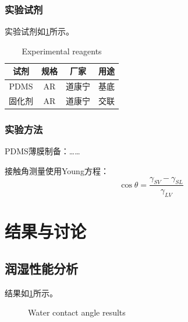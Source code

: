 \documentclass[12pt,a4paper]{swuthesis}
\begin{document}
\subsubsection{实验试剂}

实验试剂如\ref{tab:reagents}所示。

\begin{table}[H]\centering
    \caption{ 实验试剂}
    \addtocounter{table}{-1}
    \renewcommand{\tablename}{Table}
    \caption{ Experimental reagents}
    \renewcommand{\tablename}{表}
    \label{tab:reagents}
    \begin{tabular}{cccc}\toprule
        试剂 & 规格 & 厂家 & 用途 \\\midrule
        PDMS & AR & 道康宁 & 基底 \\
        固化剂 & AR & 道康宁 & 交联 \\\bottomrule
    \end{tabular}
\end{table}

\subsubsection{实验方法}

PDMS薄膜制备：……

接触角测量使用Young方程：
\begin{equation}
    \cos\theta = \frac{\gamma_{SV} - \gamma_{SL}}{\gamma_{LV}}
    \label{eq:young}
\end{equation}

\newpage
\section{结果与讨论}

\subsection{润湿性能分析}
结果如\ref{fig:ca}所示。

\begin{figure}[H]\centering
    \caption{ 水接触角测量结果}
    \addtocounter{figure}{-1}
    \renewcommand{\figurename}{Fig.}
    \caption{ Water contact angle results}
    \renewcommand{\figurename}{图}
    \label{fig:ca}
\end{figure}
\end{document}
